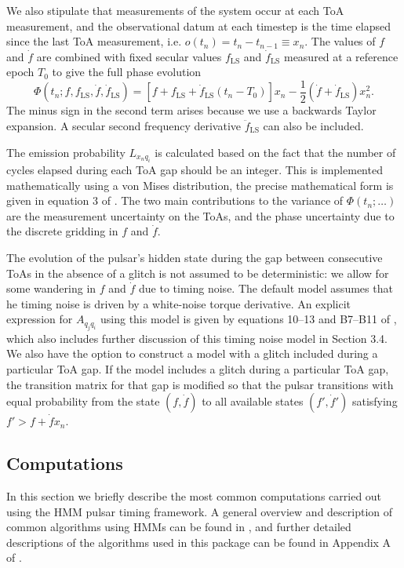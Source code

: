 \documentclass{article}
\begin{document}
We also stipulate that measurements of the system occur at each ToA measurement, and the observational datum at each timestep is the time elapsed since the last ToA measurement, i.e. $o(t_n) = t_n - t_{n-1} \equiv x_n$.
The values of $f$ and $\dot{f}$ are combined with fixed secular values $f_\text{LS}$ and $\dot{f}_\text{LS}$ measured at a reference epoch $T_0$ to give the full phase evolution \begin{equation} \Phi(t_n; f, f_\text{LS}, \dot{f}, \dot{f}_\text{LS}) = \left[f + f_\text{LS} + \dot{f}_\text{LS}(t_n-T_0)\right]x_n - \frac{1}{2}\left(\dot{f} + \dot{f}_\text{LS}\right)x_n^2. \end{equation}
The minus sign in the second term arises because we use a backwards Taylor expansion.
A secular second frequency derivative $\ddot{f}_\text{LS}$ can also be included.

The emission probability $L_{x_n q_i}$ is calculated based on the fact that the number of cycles elapsed during each ToA gap should be an integer.
This is implemented mathematically using a von Mises distribution, the precise mathematical form is given in equation 3 of \citet{Dunn2021}.
The two main contributions to the variance of $\Phi(t_n; \ldots)$ are the measurement uncertainty on the ToAs, and the phase uncertainty due to the discrete gridding in $f$ and $\dot{f}$.

The evolution of the pulsar's hidden state during the gap between consecutive ToAs in the absence of a glitch is not assumed to be deterministic: we allow for some wandering in $f$ and $\dot{f}$ due to timing noise.
The default model assumes that he timing noise is driven by a white-noise torque derivative.
An explicit expression for $A_{q_j q_i}$ using this model is given by equations 10--13 and B7--B11 of \citet{MelatosDunn2020}, which also includes further discussion of this timing noise model in Section 3.4.
We also have the option to construct a model with a glitch included during a particular ToA gap.
If the model includes a glitch during a particular ToA gap, the transition matrix for that gap is modified so that the pulsar transitions with equal probability from the state $(f, \dot{f})$ to all available states $(f', \dot{f}')$ satisfying $f' > f + \dot{f}x_n$.

\subsection{Computations}
In this section we briefly describe the most common computations carried out using the HMM pulsar timing framework.
A general overview and description of common algorithms using HMMs can be found in \citet{Rabiner1989}, and further detailed descriptions of the algorithms used in this package can be found in Appendix A of \citet{MelatosDunn2020}.
\end{document}
